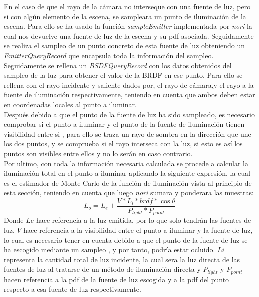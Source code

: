 \documentclass[10pt,oneside,a4paper]{article}
\begin{document}
En el caso de que el rayo de la cámara no interseque con una fuente de luz, pero si con algún elemento de la escena, se sampleara un punto de iluminación de la escena. Para ello se ha usado la función \textit{sampleEmitter} implementada por \textit{nori} la cual nos devuelve una fuente de luz de la escena y su pdf asociada. Seguidamente se realiza el sampleo de un punto concreto de esta fuente de luz obteniendo un \textit{EmitterQueryRecord} que encapsula toda la información del sampleo.\\

Seguidamente se rellena un \textit{BSDFQueryRecord} con los datos obtenidos del sampleo de la luz para obtener el valor de la BRDF en ese punto. Para ello se rellena con el rayo incidente y saliente dados por, el rayo de cámara,y el rayo a la fuente de iluminación respectivamente, teniendo en cuenta que ambos deben estar en coordenadas locales al punto a iluminar.\\

Después debido a que el punto de la fuente de luz ha sido sampleado, es necesario comprobar si el punto a iluminar y el punto de la fuente de iluminación tienen visibilidad entre si , para ello se traza un rayo de sombra en la dirección que une los dos puntos, y se comprueba si el rayo interseca con la luz, si esto es así los puntos son visibles entre ellos y no lo serán en caso contrario.\\

Por ultimo, con toda la información necesaria calculada se procede a calcular la iluminación total en el punto a iluminar aplicando la siguiente expresión, la cual es el estimador de Monte Carlo de la función de iluminación vista al principio de esta sección, teniendo en cuenta que luego \textit{nori} sumara y ponderara las muestras:
 $$L_o = L_e  + \frac{ V * L_i * brdf * \cos{\theta}}{P_{light} * P_{point}}$$ 
Donde $Le$ hace referencia a la luz emitida, por lo que solo tendrán las fuentes de luz, $V$ hace referencia a la visibilidad entre el punto a iluminar y la fuente de luz, lo cual es necesario tener en cuenta debido a que el punto de la fuente de luz se ha escogido mediante un sampleo , y por tanto, podría estar ocluido. $Li$ representa la cantidad total de luz incidente, la cual sera la luz directa de las fuentes de luz al tratarse de un método de iluminación directa y $P_{light}$ y $P_{point}$ hacen referencia a la pdf de la fuente de luz escogida y a la pdf del punto respecto a esa fuente de luz respectivamente.
\end{document}
